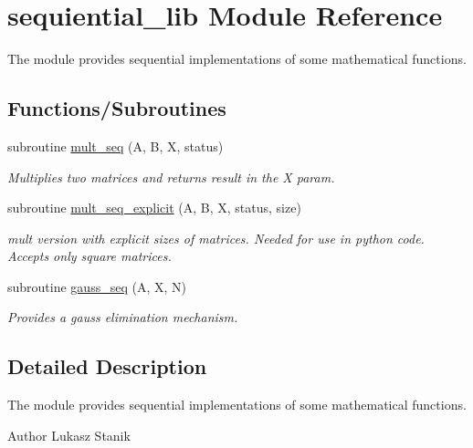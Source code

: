 \hypertarget{namespacesequiential__lib}{}\section{sequiential\+\_\+lib Module Reference}
\label{namespacesequiential__lib}


The module provides sequential implementations of some mathematical functions.  


\subsection*{Functions/\+Subroutines}
\begin{DoxyCompactItemize}
\item 
subroutine \mbox{\hyperlink{namespacesequiential__lib_a6cd53b4a73bed54417e4ca2b6964fea2}{mult\+\_\+seq}} (A, B, X, status)
\begin{DoxyCompactList}\small\item\em Multiplies two matrices and returns result in the {\ttfamily X} param. \end{DoxyCompactList}\item 
subroutine \mbox{\hyperlink{namespacesequiential__lib_a7fb67c61ed63cf2320cb5e5bada947cc}{mult\+\_\+seq\+\_\+explicit}} (A, B, X, status, size)
\begin{DoxyCompactList}\small\item\em {\ttfamily mult} version with explicit sizes of matrices. Needed for use in python code. Accepts only square matrices. \end{DoxyCompactList}\item 
subroutine \mbox{\hyperlink{namespacesequiential__lib_a4e5b7e29fdd4105f584465535bfdeb50}{gauss\+\_\+seq}} (A, X, N)
\begin{DoxyCompactList}\small\item\em Provides a gauss elimination mechanism. \end{DoxyCompactList}\end{DoxyCompactItemize}


\subsection{Detailed Description}
The module provides sequential implementations of some mathematical functions. 

\begin{DoxyAuthor}{Author}
Lukasz Stanik 
\end{DoxyAuthor}


